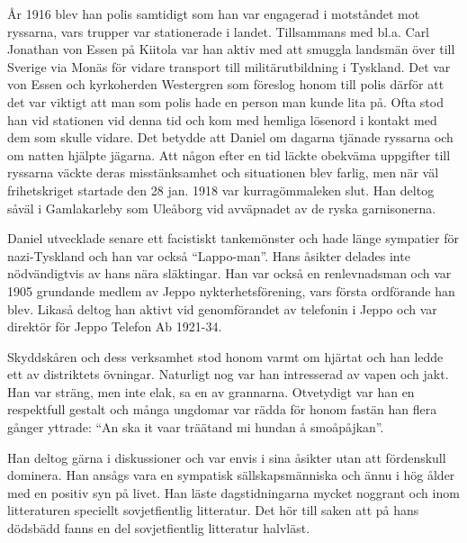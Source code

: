 År 1916 blev han polis samtidigt som han var engagerad i motståndet mot ryssarna, vars trupper var stationerade i landet. Tillsammans med bl.a. Carl Jonathan von Essen på Kiitola var han aktiv med att smuggla landsmän över till Sverige via Monäs för vidare transport till militärutbildning i Tyskland. Det var von Essen och kyrkoherden Westergren som föreslog honom till polis därför att det var viktigt att man som polis hade en person man kunde lita på. Ofta stod han vid stationen vid denna tid och kom med hemliga lösenord i kontakt med dem som skulle vidare. Det betydde att Daniel om dagarna tjänade ryssarna och om natten hjälpte jägarna. Att någon efter en tid läckte obekväma uppgifter till ryssarna väckte deras misstänksamhet och situationen blev farlig, men när väl frihetskriget startade den 28 jan. 1918 var kurragömmaleken slut. Han deltog såväl i Gamlakarleby som Uleåborg vid avväpnadet av de ryska garnisonerna.

Daniel utvecklade senare ett facistiskt tankemönster och hade länge sympatier för nazi-Tyskland och han var också ``Lappo-man''. Hans åsikter delades inte nödvändigtvis av hans nära släktingar. Han var också en renlevnadsman och var 1905 grundande medlem av Jeppo nykterhetsförening, vars första ordförande han blev. Likaså deltog han aktivt vid genomförandet av telefonin i Jeppo och var direktör för Jeppo Telefon Ab 1921-34.

Skyddskåren och dess verksamhet stod honom varmt om hjärtat och han ledde ett av distriktets övningar. Naturligt nog var han intresserad av vapen och jakt. Han var sträng, men inte elak, sa en av grannarna. Otvetydigt var han en respektfull gestalt och många ungdomar var rädda för honom fastän han flera gånger yttrade: ``An ska it vaar träätand mi hundan å smoåpåjkan''.

Han deltog gärna i diskussioner och var envis i sina åsikter utan att fördenskull dominera. Han ansågs vara en sympatisk sällskapsmänniska och ännu i hög ålder med en positiv syn på livet. Han läste dagstidningarna mycket noggrant och inom litteraturen speciellt sovjetfientlig litteratur. Det hör till saken att på hans dödsbädd fanns en del sovjetfientlig litteratur halvläst.

